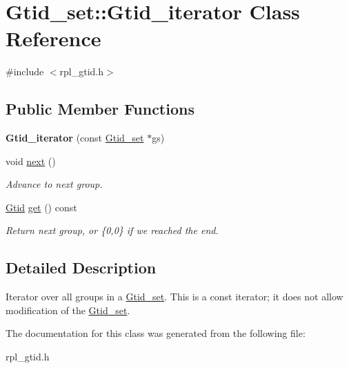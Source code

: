 \hypertarget{classGtid__set_1_1Gtid__iterator}{}\section{Gtid\+\_\+set\+:\+:Gtid\+\_\+iterator Class Reference}
\label{classGtid__set_1_1Gtid__iterator}


{\ttfamily \#include $<$rpl\+\_\+gtid.\+h$>$}

\subsection*{Public Member Functions}
\begin{DoxyCompactItemize}
\item 
\mbox{\label{classGtid__set_1_1Gtid__iterator_ad77db1f85e85d9fe50a1440e2c668282}} 
{\bfseries Gtid\+\_\+iterator} (const \mbox{\hyperlink{classGtid__set}{Gtid\+\_\+set}} $\ast$gs)
\item 
\mbox{\label{classGtid__set_1_1Gtid__iterator_a5c49b5f8c9dfc58503d5eab219afcfa5}} 
void \mbox{\hyperlink{classGtid__set_1_1Gtid__iterator_a5c49b5f8c9dfc58503d5eab219afcfa5}{next}} ()
\begin{DoxyCompactList}\small\item\em Advance to next group. \end{DoxyCompactList}\item 
\mbox{\label{classGtid__set_1_1Gtid__iterator_a1491608e053abb0195759de37808516d}} 
\mbox{\hyperlink{structGtid}{Gtid}} \mbox{\hyperlink{classGtid__set_1_1Gtid__iterator_a1491608e053abb0195759de37808516d}{get}} () const
\begin{DoxyCompactList}\small\item\em Return next group, or \{0,0\} if we reached the end. \end{DoxyCompactList}\end{DoxyCompactItemize}


\subsection{Detailed Description}
Iterator over all groups in a \mbox{\hyperlink{classGtid__set}{Gtid\+\_\+set}}. This is a const iterator; it does not allow modification of the \mbox{\hyperlink{classGtid__set}{Gtid\+\_\+set}}. 

The documentation for this class was generated from the following file\+:\begin{DoxyCompactItemize}
\item 
rpl\+\_\+gtid.\+h\end{DoxyCompactItemize}
